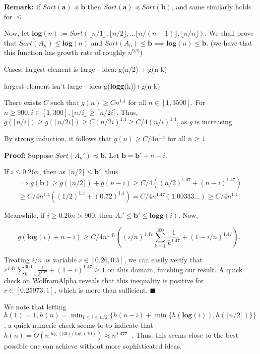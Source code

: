 \documentclass{article}
\begin{document}
\textbf{Remark:} if $Sort(\textbf{a}) \preceq \textbf{b}$ then $Sort(\textbf{a}) \preceq Sort(\textbf{b})$, and same similarly holds for $\le$


Now, let $\textbf{log}(n):= Sort( \lfloor n/1 \rfloor,\lfloor n/2 \rfloor, \dots  \lfloor n/(n-1) \rfloor, \lfloor n/n \rfloor)$. We shall prove that $Sort(A_n) \le \textbf{log}(n)$ and $Sort(A_n) \le \textbf{b} \implies \textbf{log}(n)  \le \textbf{b}$. (we have that this function has growth rate of roughly $n^{9/5}$)

Cases: largest element is large - idea: g(n/2) + g(n-k)

largest element isn't large - idea g(\textbf{logg}(k))+g(n-k)

There exists $C$ such that $g(n) \ge C n^{1.4}$ for all $n \in [1,3500]$. For $n\ge 900, i \in [1,300], \lfloor n/i\rfloor \ge \lceil n/2i\rceil $. Thus, $g(\lfloor n/i \rfloor) \ge  g(\lceil n/2i\rceil ) \ge C(n/2i)^{1.4} \ge C/4 (n/i)^{1.4}$, as $g$ is increasing.

By strong induction, it follows that $g(n) \ge C/4 n^{1.4}$ for all $n \ge 1$.

\textbf{Proof:} Suppose $Sort(A_n')\preceq \textbf{b}$. Let $\textbf{b} = \textbf{b}'+n-i$.

If $i \le 0.26 n$, then as $\lfloor n/2\rfloor \le \textbf{b}'$, thus\[\implies g(\textbf{b}) \ge g(\lfloor n/2 \rfloor) +g(n-i)\ge C/4( (n/2)^{1.47}+ (n-i)^{1.47}) \]\[\ge C/4 n^{1.4}( (1/2)^{1.4}+ (0.72)^{1.4}) =  C/4 n^{1.47}(1.00333\dots) \ge C/4 n^{1.4}.\]

Meanwhile, if $i \ge 0.26 n > 900 $, then $A_i' \le \textbf{b}' \le \textbf{logg}(i)$. Now,

\[g(\textbf{log}(i)+n-i) \ge C/4 n^{1.47} \left((i/n)^{1.47}\sum_{k=1}^{300} \frac{1}{k^{1.47}} + (1-i/n)^{1.47}\right).\]

Treating $i/n$ as variable $r \in [0.26,0.5]$, we can easily verify that $r^{1.47} \sum_{k=1}^{300} \frac{1}{k^{1.47}} + (1-r)^{1.47} \ge 1$ on this domain, finishing our result. A quick check on WolframAlpha reveals that this inequality is positive for $r\in[0.25973,1]$, which is more than sufficient. $\blacksquare$

We note that letting $h(1) =1, h(n) = \min_{1\le i \le n/2} \{ h(n-i)+\min\{h(\textbf{log}(i)),h(\lfloor n/2\rfloor )\}\}$, a quick numeric check seems to to indicate that $h(n) = \Theta(n^{\log(30)/\log(10)}) \approx n^{1.477\dots}$. Thus, this seems close to the best possible one can achieve without more sophisticated ideas.
\end{document}

